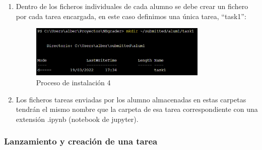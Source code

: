 \begin{enumerate}
\item Dentro de los ficheros individuales de cada alumno se debe crear un fichero por cada tarea encargada, en este caso definimos una única tarea, “task1”:

\begin{figure}[H]
    \centering
    \includegraphics[width=0.8\textwidth]{img/instal/instal_4.png}
    \caption{Proceso de instalación 4}
\end{figure}

\item Los ficheros tareas enviadas por los alumno almacenadas en estas carpetas tendrán el mismo nombre que la carpeta de esa tarea correspondiente con una extensión .ipynb (notebook de jupyter).

\end{enumerate}


\subsubsection{Lanzamiento y creación de una tarea}

